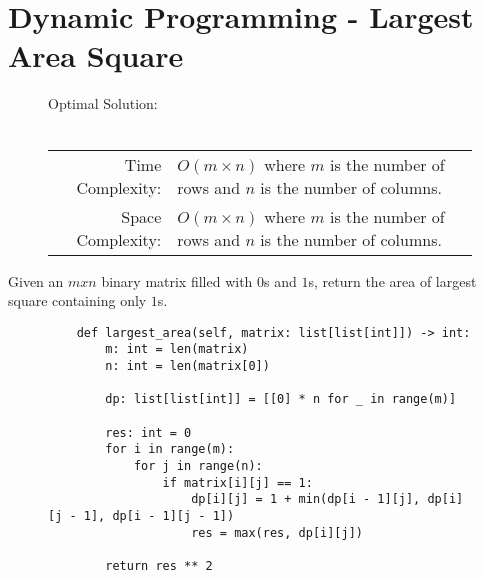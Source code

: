 
\section{Dynamic Programming - Largest Area Square}

\begin{figure}[H]
    Optimal Solution:\\\\
    \begin{tabular}{rl}
        Time Complexity:& \(O(m \times n)\) where \(m\) is the number of rows
        and \(n\) is the number of columns.\\
        Space Complexity:& \(O(m \times n)\) where \(m\) is the number of rows
        and \(n\) is the number of columns.
    \end{tabular}
\end{figure}

Given an \(m x n\) binary matrix filled with \(0\)s and \(1\)s, return the area
of largest square containing only \(1\)s.

\begin{figure}[H]
    \centering
    \begin{verbatim}
    def largest_area(self, matrix: list[list[int]]) -> int:
        m: int = len(matrix)
        n: int = len(matrix[0])

        dp: list[list[int]] = [[0] * n for _ in range(m)]

        res: int = 0
        for i in range(m):
            for j in range(n):
                if matrix[i][j] == 1:
                    dp[i][j] = 1 + min(dp[i - 1][j], dp[i][j - 1], dp[i - 1][j - 1])
                    res = max(res, dp[i][j])

        return res ** 2
    \end{verbatim}
\end{figure}
